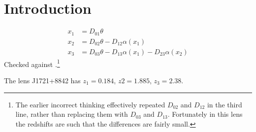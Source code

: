 \documentclass[12pt]{article}
\title{}
\author{The usual suspects}
\date{January 2025}
\begin{document}
\maketitle

\section{Introduction}

\begin{equation}
\begin{aligned}
  x_1 &= D_{01} \theta \\
  x_2 &= D_{02} \theta - D_{12} \alpha(x_1) \\
  x_3 &= D_{03} \theta - D_{13} \alpha(x_1) - D_{23} \alpha(x_2)
\end{aligned}
\end{equation}
Checked against \cite{2016MNRAS.456.2210C}.\footnote{The earlier
incorrect thinking effectively repeated $D_{02}$ and $D_{12}$ in the
third line, rather than replacing them with $D_{03}$ and $D_{13}$.
Fortunately in this lens the redshifts are such that the differences
are fairly small.}

The lens J1721+8842 has \citep{2018MNRAS.479.5060L,2024arXiv241104177D}
$z_1=0.184$, $z2=1.885$, $z_3=2.38$.

\newcommand{\mnras}{MNRAS}



\end{document}
